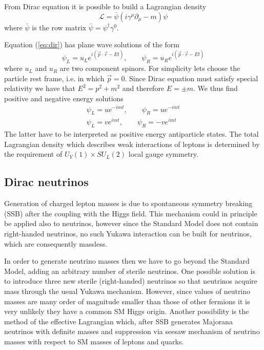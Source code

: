 \documentclass{subnucbo}
\begin{document}
From Dirac equation it is possible to build a Lagrangian density
\begin{equation}
\label{eq:DirLag}
\mathcal{L}=\bar{\psi}(i\gamma^{\mu}\partial_{\mu}-m)\psi
\end{equation}
where $\bar{\psi}$ is the row matrix $\bar{\psi}=\psi^{\dagger}\gamma^0$.

Equation (\ref{eq:dir}) has plane wave solutions of the form
\begin{equation}
\psi_L=u_Le^{i(\vec{p}\cdot\vec{r}-Et)},
\qquad
\psi_R=u_Re^{i(\vec{p}\cdot\vec{r}-Et)}
\end{equation}
where $u_L$ and $u_R$ are two component spinors. For simplicity lets choose the particle rest frame, i.e. in which $\vec{p}=0$. Since Dirac equation must satisfy special relativity we have that $E^2=p^2+m^2$ and therefore $E=\pm m$. We thus find positive and negative energy solutions%
\begin{gather}
\psi_L=ue^{-imt},\qquad  \psi_R=ue^{-imt} \\
\psi_L=ve^{imt},\qquad  \psi_R=-ve^{imt}
\end{gather}
The latter have to be interpreted as positive energy antiparticle states.
The total Lagrangian density which describes weak interactions of leptons is determined by the requirement of $U_Y(1)\times SU_L(2)$ local gauge symmetry.

\subsection{Dirac neutrinos}
Generation of charged lepton masses is due to spontaneous symmetry breaking (SSB) after the coupling with the Higgs field.
This mechanism could in principle be applied also to neutrinos, however since the Standard Model does not contain right-handed neutrinos, no such Yukawa interaction can be built for neutrinos, which are consequently massless.

In order to generate neutrino masses then we have to go beyond the Standard Model, adding an arbitrary number of sterile neutrinos.
One possible solution is to introduce three new sterile (right-handed) neutrinos so that neutrinos acquire mass through the usual Yukawa mechanism.  However, since values of neutrino masses are many order of magnitude smaller than those of other fermions it is very unlikely they have a common SM Higgs origin.
Another possibility is the method of the effective Lagrangian which, after SSB generates Majorana neutrinos with definite masses and suppression via seesaw mechanism of neutrino masses with respect to SM masses of leptons and quarks.
\end{document}
